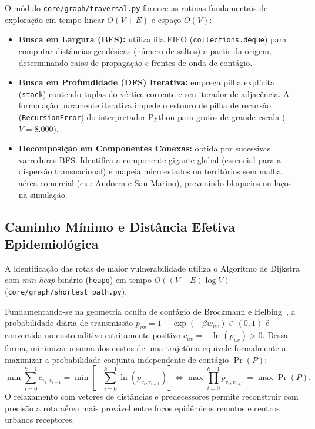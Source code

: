 \documentclass[11pt]{article}
\begin{document}
O módulo \texttt{core/graph/traversal.py} fornece as rotinas fundamentais de exploração em tempo linear $O(V + E)$ e espaço $O(V)$:
\begin{itemize}
  \item \textbf{Busca em Largura (BFS):} utiliza fila FIFO (\texttt{collections.deque}) para computar distâncias geodésicas (número de saltos) a partir da origem, determinando raios de propagação e frentes de onda de contágio.
  \item \textbf{Busca em Profundidade (DFS) Iterativa:} emprega pilha explícita (\texttt{stack}) contendo tuplas do vértice corrente e seu iterador de adjacência. A formulação puramente iterativa impede o estouro de pilha de recursão (\texttt{RecursionError}) do interpretador Python para grafos de grande escala ($V = 8.000$).
  \item \textbf{Decomposição em Componentes Conexas:} obtida por sucessivas varreduras BFS. Identifica a componente gigante global (essencial para a dispersão transnacional) e mapeia microestados ou territórios sem malha aérea comercial (ex.: Andorra e San Marino), prevenindo bloqueios ou laços na simulação.
\end{itemize}

\subsection{Caminho Mínimo e Distância Efetiva Epidemiológica}

A identificação das rotas de maior vulnerabilidade utiliza o Algoritmo de Dijkstra com \emph{min-heap} binário (\texttt{heapq}) em tempo $O((V + E) \log V)$ (\texttt{core/graph/shortest\_path.py}).

Fundamentando-se na geometria oculta de contágio de Brockmann e Helbing~\cite{brockmann2013}, a probabilidade diária de transmissão $p_{uv} = 1 - \exp(-\beta w_{uv}) \in (0, 1)$ é convertida no custo aditivo estritamente positivo $c_{uv} = -\ln(p_{uv}) > 0$. Dessa forma, minimizar a soma dos custos de uma trajetória equivale formalmente a maximizar a probabilidade conjunta independente de contágio $\Pr(P)$:
\begin{equation}
\min \sum_{i=0}^{k-1} c_{v_i, v_{i+1}} = \min \left[ -\sum_{i=0}^{k-1} \ln(p_{v_i, v_{i+1}}) \right] \iff \max \prod_{i=0}^{k-1} p_{v_i, v_{i+1}} = \max \Pr(P).
\end{equation}
O relaxamento com vetores de distâncias e predecessores permite reconstruir com precisão a rota aérea mais provável entre focos epidêmicos remotos e centros urbanos receptores.
\end{document}
